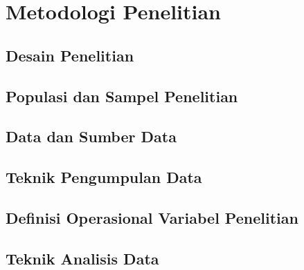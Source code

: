 \chapter{Metodologi Penelitian}

\lipsum[1]

\section{Desain Penelitian}

\lipsum[1]

\section{Populasi dan Sampel Penelitian}

\lipsum[1]

\section{Data dan Sumber Data}

\lipsum[1]

\section{Teknik Pengumpulan Data}

\lipsum[1]

\section{Definisi Operasional Variabel Penelitian}

\lipsum[1]

\section{Teknik Analisis Data}

\lipsum[1]
